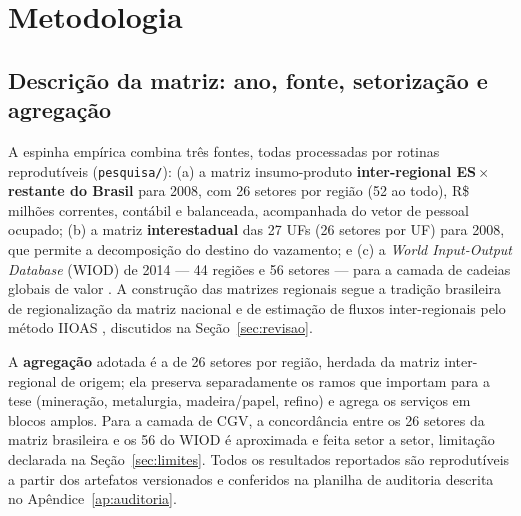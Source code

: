 \documentclass[11pt,a4paper]{article}
\begin{document}
\section{Metodologia}
\label{sec:metodo}

\subsection{Descrição da matriz: ano, fonte, setorização e agregação}
\label{sec:dados}
A espinha empírica combina três fontes, todas processadas por rotinas
reprodutíveis (\texttt{pesquisa/}): (a) a matriz insumo-produto
\textbf{inter-regional ES\,$\times$\,restante do Brasil} para 2008, com 26
setores por região (52 ao todo), R\$ milhões correntes, contábil e balanceada,
acompanhada do vetor de pessoal ocupado; (b) a matriz \textbf{interestadual}
das 27 UFs (26 setores por UF) para 2008, que permite a decomposição do destino
do vazamento; e (c) a \emph{World Input-Output Database} (WIOD) de 2014 --- 44
regiões e 56 setores --- para a camada de cadeias globais de valor
\citep{timmer2015wiod}. A construção das matrizes regionais segue a tradição
brasileira de regionalização da matriz nacional \citep{guilhoto2005estimacao} e
de estimação de fluxos inter-regionais pelo método IIOAS
\citep{haddad2017iioas}, discutidos na Seção~\ref{sec:revisao}.

A \textbf{agregação} adotada é a de 26 setores por região, herdada da matriz
inter-regional de origem; ela preserva separadamente os ramos que importam
para a tese (mineração, metalurgia, madeira/papel, refino) e agrega os
serviços em blocos amplos. Para a camada de CGV, a concordância entre os 26
setores da matriz brasileira e os 56 do WIOD é aproximada e feita setor a
setor, limitação declarada na Seção~\ref{sec:limites}. Todos os resultados
reportados são reprodutíveis a partir dos artefatos versionados e conferidos
na planilha de auditoria descrita no Apêndice~\ref{ap:auditoria}.
\end{document}
